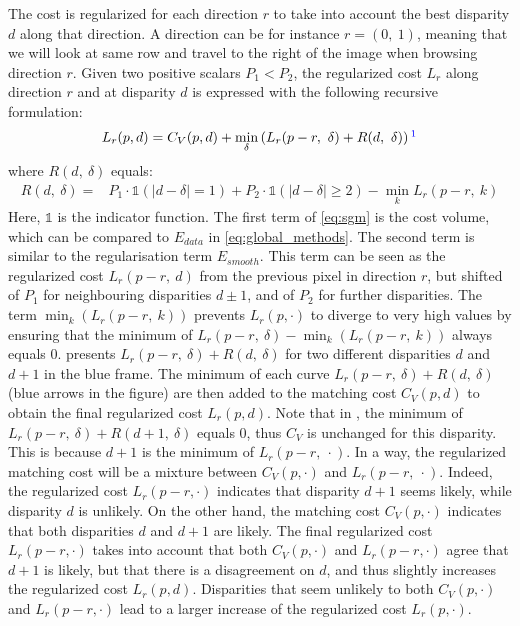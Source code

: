 The cost is regularized for each direction $r$ to take into account the best disparity $d$ along that direction. A direction can be for instance $r=(0,~1)$, meaning that we will look at same row and travel to the right of the image when browsing direction $r$. Given two positive scalars $P_1<P_2$, the regularized cost $L_r$ along direction $r$ and at disparity $d$ is expressed with the following recursive formulation:
\begin{align}\label{eq:sgm}
    L_r(p,d) = C_V(p,d) + \min_\delta \left(L_r(p-r,~\delta) + R(d, ~\delta)\right)\commanue{elle est bizarre la formulation de SGM. Je comprends le $\delta$, c'est pas évident de retrouver la formule de l'article}
\end{align}
where $R(d, ~\delta)$ equals:
\begin{align}
    R(d, ~\delta) = &P_1\cdot\mathds{1}(|d-\delta|=1) + P_2\cdot\mathds{1}(|d-\delta|\geqslant 2) - \min_k L_r(p-r,~k) \label{eq:sgm_penalties}
\end{align}
Here, $\mathds{1}$ is the indicator function. The first term of \cref{eq:sgm} is the cost volume, which can be compared to $E_{data}$ in \cref{eq:global_methods}. The second term is similar to the regularisation term $E_{smooth}$. This term can be seen as the regularized cost $L_r(p-r, ~d)$ from the previous pixel in direction $r$, but shifted of $P_1$ for neighbouring disparities $d\pm1$, and of $P_2$ for further disparities. The term $\min_k(L_r(p-r,~k))$ prevents $L_r(p,\cdot)$ to diverge to very high values by ensuring that the minimum of $L_r(p-r,~\delta) - \min_k(L_r(p-r,~k))$ always equals $0$.  presents $L_r(p-r,~\delta) + R(d, ~\delta)$ for two different disparities $d$ and $d+1$ in the blue frame. The minimum of each curve $L_r(p-r,~\delta) + R(d, ~\delta)$ (blue arrows in the figure) are then added to the matching cost $C_V(p,d)$ to obtain the final regularized cost $L_r(p,d)$. Note that in , the minimum of $L_r(p-r,~\delta)+R(d+1, ~\delta)$ equals $0$, thus $C_V$ is unchanged for this disparity. This is because $d+1$ is the minimum of $L_r(p-r,~\cdot)$. In a way, the regularized matching cost will be a mixture between $C_V(p,\cdot)$ and $L_r(p-r,~\cdot)$. Indeed, the regularized cost $L_r(p-r,\cdot)$ indicates that disparity $d+1$ seems likely, while disparity $d$ is unlikely. On the other hand, the matching cost $C_V(p,\cdot)$ indicates that both disparities $d$ and $d+1$ are likely. The final regularized cost $L_r(p-r,\cdot)$ takes into account that both $C_V(p,\cdot)$ and $L_r(p-r,\cdot)$ agree that $d+1$ is likely, but that there is a disagreement on $d$, and thus slightly increases the regularized cost $L_r(p,d)$. Disparities that seem unlikely to both $C_V(p,\cdot)$ and $L_r(p-r,\cdot)$ lead to a larger increase of the regularized cost $L_r(p,\cdot)$.
